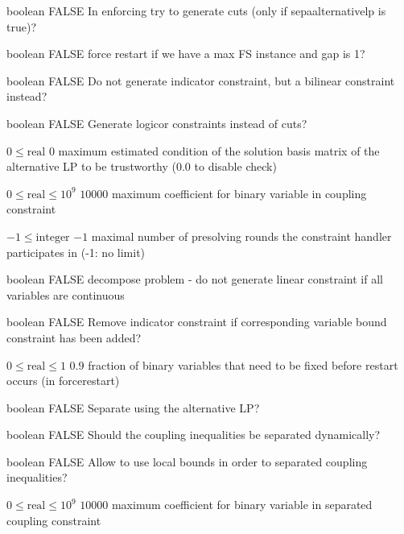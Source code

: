 %
{boolean}%
{FALSE}%
{In enforcing try to generate cuts (only if sepaalternativelp is true)?}%
{}

%
{boolean}%
{FALSE}%
{force restart if we have a max FS instance and gap is 1?}%
{}

%
{boolean}%
{FALSE}%
{Do not generate indicator constraint, but a bilinear constraint instead?}%
{}

%
{boolean}%
{FALSE}%
{Generate logicor constraints instead of cuts?}%
{}

%
{$0\leq\textrm{real}$}%
{$0$}%
{maximum estimated condition of the solution basis matrix of the alternative LP to be trustworthy (0.0 to disable check)}%
{}

%
{$0\leq\textrm{real}\leq10^{  9}$}%
{$10000$}%
{maximum coefficient for binary variable in coupling constraint}%
{}

%
{$-1\leq\textrm{integer}$}%
{$-1$}%
{maximal number of presolving rounds the constraint handler participates in (-1: no limit)}%
{}

%
{boolean}%
{FALSE}%
{decompose problem - do not generate linear constraint if all variables are continuous}%
{}

%
{boolean}%
{FALSE}%
{Remove indicator constraint if corresponding variable bound constraint has been added?}%
{}

%
{$0\leq\textrm{real}\leq1$}%
{$0.9$}%
{fraction of binary variables that need to be fixed before restart occurs (in forcerestart)}%
{}

%
{boolean}%
{FALSE}%
{Separate using the alternative LP?}%
{}

%
{boolean}%
{FALSE}%
{Should the coupling inequalities be separated dynamically?}%
{}

%
{boolean}%
{FALSE}%
{Allow to use local bounds in order to separated coupling inequalities?}%
{}

%
{$0\leq\textrm{real}\leq10^{  9}$}%
{$10000$}%
{maximum coefficient for binary variable in separated coupling constraint}%
{}

